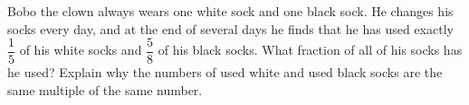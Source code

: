 Bobo the clown always wears one white sock and one black sock. He changes his socks every day, and at the end of several days he finds that he has used exactly $\dfrac{1}{5}$ of his white socks and $\dfrac{5}{8}$ of his black socks. What fraction of all of his socks has he used? Explain why the numbers of used white and used black socks are the same multiple of the same number.
